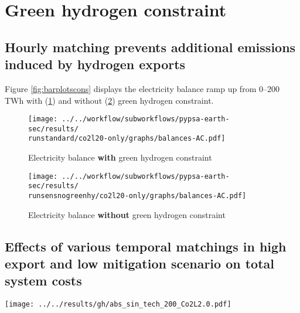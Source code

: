 \section{Green hydrogen constraint}
\label{subsec:gh_constraint_effects}

\subsection{Hourly matching prevents additional emissions induced by hydrogen exports}
Figure \ref{fig:barplotscons} displays the electricity balance ramp up from 0--200 TWh with (\ref{fig:balances_AC_monthlymatch}) and without (\ref{fig:balances_AC_nogreen}) green hydrogen constraint.

\begin{figure*}[h!]
    \centering
    \begin{subfigure}[b]{0.49\linewidth}
        \centering
        \texttt{[image: ../../workflow/subworkflows/pypsa-earth-sec/results/\\runstandard/co2l20-only/graphs/balances-AC.pdf]}
        \caption{Electricity balance {\bf with} green hydrogen constraint}
        \label{fig:balances_AC_monthlymatch}
    \end{subfigure}
    \hfill
    \begin{subfigure}[b]{0.49\linewidth}
        \centering
        \texttt{[image: ../../workflow/subworkflows/pypsa-earth-sec/results/\\runsensnogreenhy/co2l20-only/graphs/balances-AC.pdf]}
        \caption{Electricity balance {\bf without} green hydrogen constraint}
        \label{fig:balances_AC_nogreen}
    \end{subfigure}
    \hfill
    \caption{Electricity balance ramp up from 0--200 TWh with (\ref{fig:balances_AC_monthlymatch}) and without (\ref{fig:balances_AC_nogreen}) green hydrogen constraint}
    \label{fig:barplotscons}
\end{figure*}


\subsection{Effects of various temporal matchings in high export and low mitigation scenario on total system costs}

\begin{figure*}[h]
    \centering
    \texttt{[image: ../../results/gh/abs\_sin\_tech\_200\_Co2L2.0.pdf]}
    \caption{Total system costs at 200 TWh export and 0\% domestic mitigation. Stricter hydrogen regulation mainly increases the total CAPEX of additional solar PV, electrolysis and hydrogen storage. In return, the OPEX of fossil generation (mainly gas), decreases. The large share of oil OPEX is independent of hydrogen regulation, since these expenditures are mainly linked to combustion engine cars with demands independent of hydrogen regulation.}
    \label{fig:tsc-200-0}
\end{figure*}




